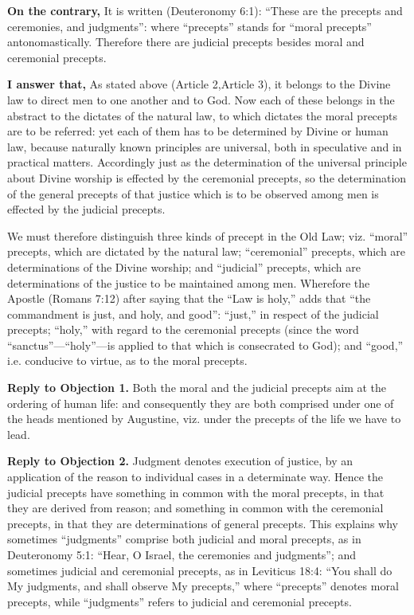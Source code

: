 \textbf{On the contrary,} It is written (Deuteronomy 6:1): ``These are the precepts and ceremonies, and judgments'': where ``precepts'' stands for ``moral precepts'' antonomastically. Therefore there are judicial precepts besides moral and ceremonial precepts.

\textbf{I answer that,} As stated above (Article 2,Article 3), it belongs to the Divine law to direct men to one another and to God. Now each of these belongs in the abstract to the dictates of the natural law, to which dictates the moral precepts are to be referred: yet each of them has to be determined by Divine or human law, because naturally known principles are universal, both in speculative and in practical matters. Accordingly just as the determination of the universal principle about Divine worship is effected by the ceremonial precepts, so the determination of the general precepts of that justice which is to be observed among men is effected by the judicial precepts.

We must therefore distinguish three kinds of precept in the Old Law; viz. ``moral'' precepts, which are dictated by the natural law; ``ceremonial'' precepts, which are determinations of the Divine worship; and ``judicial'' precepts, which are determinations of the justice to be maintained among men. Wherefore the Apostle (Romans 7:12) after saying that the ``Law is holy,'' adds that ``the commandment is just, and holy, and good'': ``just,'' in respect of the judicial precepts; ``holy,'' with regard to the ceremonial precepts (since the word ``sanctus''—``holy''—is applied to that which is consecrated to God); and ``good,'' i.e. conducive to virtue, as to the moral precepts.

\textbf{Reply to Objection 1.} Both the moral and the judicial precepts aim at the ordering of human life: and consequently they are both comprised under one of the heads mentioned by Augustine, viz. under the precepts of the life we have to lead.

\textbf{Reply to Objection 2.} Judgment denotes execution of justice, by an application of the reason to individual cases in a determinate way. Hence the judicial precepts have something in common with the moral precepts, in that they are derived from reason; and something in common with the ceremonial precepts, in that they are determinations of general precepts. This explains why sometimes ``judgments'' comprise both judicial and moral precepts, as in Deuteronomy 5:1: ``Hear, O Israel, the ceremonies and judgments''; and sometimes judicial and ceremonial precepts, as in Leviticus 18:4: ``You shall do My judgments, and shall observe My precepts,'' where ``precepts'' denotes moral precepts, while ``judgments'' refers to judicial and ceremonial precepts.

